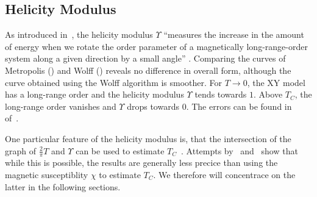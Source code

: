 	\subsection{Helicity Modulus}\label{sec:res:helicity:observable}
		As introduced in~, the helicity modulus $\Upsilon$ \enquote{measures the increase in the amount of energy when we rotate the order parameter of a magnetically long-range-order system along a given direction by a small angle} \citep[p. 1]{krueger}. Comparing the curves of Metropolis () and Wolff () reveals no difference in overall form, although the curve obtained using the Wolff algorithm is smoother. For $T \rightarrow 0$, the XY model has a long-range order and the helicity modulus $\Upsilon$ tends towards $1$. Above $T_C$, the long-range order vanishes and $\Upsilon$ drops towards $0$. The errors can be found in~ of~.
		
		One particular feature of the helicity modulus is, that the intersection of the graph of $\frac{2}{\pi} T$ and $\Upsilon$ can be used to estimate $T_C$~\citep{teitel_helicity}. Attempts by~\cite{teitel_helicity} and~\cite{olsson_helicity} show that while this is possible, the results are generally less precice than using the magnetic susceptiblity $\chi$ to estimate $T_C$. We therefore will concentrace on the latter in the following sections.

	